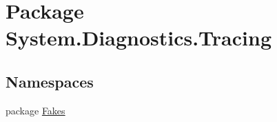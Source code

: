 \hypertarget{namespace_system_1_1_diagnostics_1_1_tracing}{\section{Package System.\-Diagnostics.\-Tracing}
\label{namespace_system_1_1_diagnostics_1_1_tracing}
}
\subsection*{Namespaces}
\begin{DoxyCompactItemize}
\item 
package \hyperlink{namespace_system_1_1_diagnostics_1_1_tracing_1_1_fakes}{Fakes}
\end{DoxyCompactItemize}
